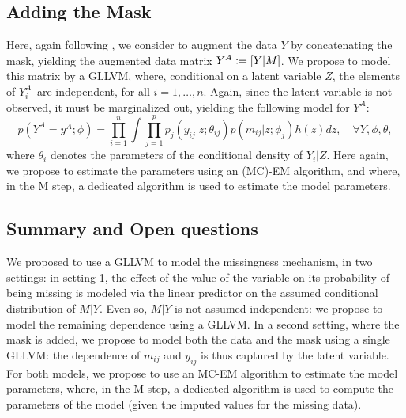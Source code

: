 \documentclass{article}
\begin{document}
\subsection{Adding the Mask}
Here, again following \textcite{sportisse_imputation_2020}, we consider to augment the data $Y$ by concatenating the mask, yielding the augmented data matrix $Y^A \vcentcolon =[Y|M]$. We propose to model this matrix by a GLLVM, where, conditional on a latent variable $Z$, the elements of $Y^A_{i\cdot}$ are independent, for all $i=1, \dots, n$. Again, since the latent variable is not observed, it must be marginalized out, yielding the following model for $Y^A$:
%
\begin{equation}
    p(Y^A = y^A; \phi) = \prod_{i=1}^n \int \prod_{j=1}^p p_j(y_{ij} |z; \theta_{ij}) p(m_{ij} |z; \phi_j) h(z) dz, \quad \forall Y, \phi, \theta,
\end{equation}
%
where $\theta_i$ denotes the parameters of the conditional density of $Y_i|Z$. Here again, we propose to estimate the parameters using an (MC)-EM algorithm, and where, in the M step, a dedicated algorithm is used to estimate the model parameters.

\subsection{Summary and Open questions}
We proposed to use a GLLVM to model the missingness mechanism, in two settings: in setting 1, the effect of the value of the variable on its probability of being missing is modeled via the linear predictor on the assumed conditional distribution of $M|Y$. Even so, $M|Y$ is not assumed independent: we propose to model the remaining dependence using a GLLVM. In a second setting, where the mask is added, we propose to model both the data and the mask using a single GLLVM: the dependence of $m_{ij}$ and $y_{ij}$ is thus captured by the latent variable. For both models, we propose to use an MC-EM algorithm to estimate the model parameters, where, in the M step, a dedicated algorithm is used to compute the parameters of the model (given the imputed values for the missing data).
\end{document}

